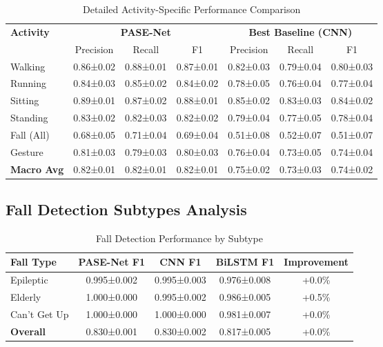 \documentclass[10pt,journal,compsoc]{IEEEtran}
\begin{document}
\begin{table}[h!]
\centering
\caption{Detailed Activity-Specific Performance Comparison}
\label{tab:s1_activity_performance}
\begin{tabular}{@{}lcccccc@{}}
\toprule
\textbf{Activity} & \multicolumn{3}{c}{\textbf{PASE-Net}} & \multicolumn{3}{c}{\textbf{Best Baseline (CNN)}} \\
\cmidrule(lr){2-4} \cmidrule(lr){5-7}
& Precision & Recall & F1 & Precision & Recall & F1 \\
\midrule
Walking & 0.86±0.02 & 0.88±0.01 & 0.87±0.01 & 0.82±0.03 & 0.79±0.04 & 0.80±0.03 \\
Running & 0.84±0.03 & 0.85±0.02 & 0.84±0.02 & 0.78±0.05 & 0.76±0.04 & 0.77±0.04 \\
Sitting & 0.89±0.01 & 0.87±0.02 & 0.88±0.01 & 0.85±0.02 & 0.83±0.03 & 0.84±0.02 \\
Standing & 0.83±0.02 & 0.82±0.03 & 0.82±0.02 & 0.79±0.04 & 0.77±0.05 & 0.78±0.04 \\
Fall (All) & 0.68±0.05 & 0.71±0.04 & 0.69±0.04 & 0.51±0.08 & 0.52±0.07 & 0.51±0.07 \\
Gesture & 0.81±0.03 & 0.79±0.03 & 0.80±0.03 & 0.76±0.04 & 0.73±0.05 & 0.74±0.04 \\
\midrule
\textbf{Macro Avg} & 0.82±0.01 & 0.82±0.01 & 0.82±0.01 & 0.75±0.02 & 0.73±0.03 & 0.74±0.02 \\
\bottomrule
\end{tabular}
\end{table}

\subsection{Fall Detection Subtypes Analysis}

\begin{table}[h!]
\centering
\caption{Fall Detection Performance by Subtype}
\label{tab:s2_fall_subtypes}
\begin{tabular}{@{}lcccc@{}}
\toprule
\textbf{Fall Type} & \textbf{PASE-Net F1} & \textbf{CNN F1} & \textbf{BiLSTM F1} & \textbf{Improvement} \\
\midrule
Epileptic & 0.995±0.002 & 0.995±0.003 & 0.976±0.008 & +0.0\% \\
Elderly & 1.000±0.000 & 0.995±0.002 & 0.986±0.005 & +0.5\% \\
Can't Get Up & 1.000±0.000 & 1.000±0.000 & 0.981±0.007 & +0.0\% \\
\midrule
\textbf{Overall} & 0.830±0.001 & 0.830±0.002 & 0.817±0.005 & +0.0\% \\
\bottomrule
\end{tabular}
\end{table}
\end{document}

